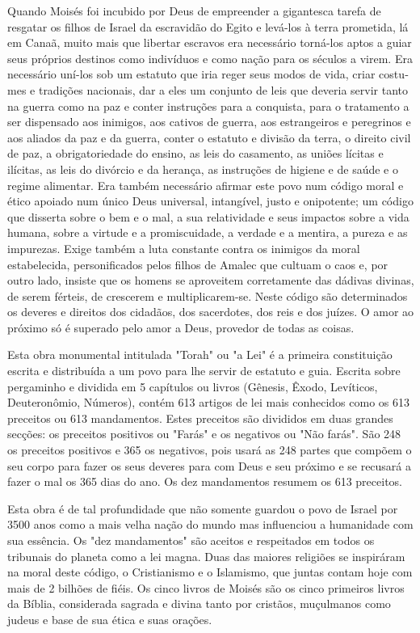 \begin{itemize}
Quando Moisés foi incubido por Deus de empreender a gigantesca tare­fa
de resgatar os filhos de Israel da escravidão do Egito e levá-los à
terra prometida, lá em Canaã, muito mais que libertar escravos era
necessário torná-los aptos a guiar seus próprios destinos como
indivíduos e como nação para os séculos a virem. Era necessário uní-los
sob um estatuto que iria reger seus modos de vida, criar costu­mes e
tradições nacionais, dar a eles um conjunto de leis que deveria servir
tanto na guerra como na paz e conter instruções para a conquista, para o
tratamento a ser dispensado aos inimigos, aos cativos de guerra, aos
estrangeiros e peregrinos e aos aliados da paz e da guerra, conter o
estatuto e divisão da terra, o direito civil de paz, a obrigatoriedade
do ensino, as leis do casamento, as uniões lícitas e ilícitas, as leis
do divórcio e da herança, as instruções de higiene e de saúde e o regime
alimentar. Era também necessário afirmar este povo num código moral e
ético apoia­do num único Deus universal, intangível, justo e onipotente;
um código que dis­serta sobre o bem e o mal, a sua relatividade e seus
impactos sobre a vida humana, sobre a virtude e a promiscuidade, a
verdade e a mentira, a pureza e as impurezas. Exige também a luta
constante contra os inimigos da moral estabelecida, personifi­cados
pelos filhos de Amalec que cultuam o caos e, por outro lado, insiste que
os homens se aproveitem corretamente das dádivas divinas, de serem
férteis, de cres­cerem e multiplicarem-se. Neste código são determinados
os deveres e direitos dos cidadãos, dos sacerdotes, dos reis e dos
juízes. O amor ao próximo só é superado pelo amor a Deus, provedor de
todas as coisas.

Esta obra monumental intitulada "Torah" ou "a Lei" é a primeira
cons­tituição escrita e distribuída a um povo para lhe servir de
estatuto e guia. Escrita sobre pergaminho e dividida em 5 capítulos ou
livros (Gênesis, Êxodo, Levíticos, Deuteronômio, Números), contém 613
artigos de lei mais conhecidos como os 613 preceitos ou 613 mandamentos.
Estes preceitos são divididos em duas grandes sec­ções: os preceitos
positivos ou "Farás" e os negativos ou "Não farás". São 248 os preceitos
positivos e 365 os negativos, pois usará as 248 partes que compõem o seu
corpo para fazer os seus deveres para com Deus e seu próximo e se
recusará a fazer o mal os 365 dias do ano. Os dez mandamentos resumem os
613 preceitos.

Esta obra é de tal profundidade que não somente guardou o povo de Israel
por 3500 anos como a mais velha nação do mundo mas influenciou a
huma­nidade com sua essência. Os "dez mandamentos" são aceitos e
respeitados em to­dos os tribunais do planeta como a lei magna. Duas das
maiores religiões se inspirá­ram na moral deste código, o Cristianismo e
o Islamismo, que juntas contam hoje com mais de 2 bilhões de fiéis. Os
cinco livros de Moisés são os cinco primeiros livros da Bíblia,
considerada sagrada e divina tanto por cristãos, muçulmanos como judeus
e base de sua ética e suas orações.


\end{itemize}
